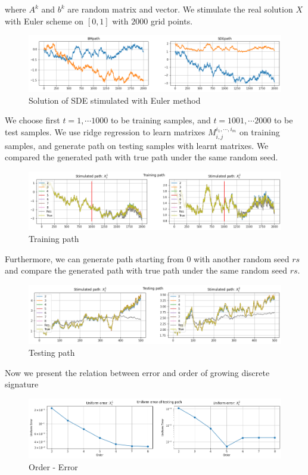 \documentclass[12pt]{report}
\theoremstyle{definition}
\theoremstyle{remark}
\begin{document}
where $A^{k}$ and $b^{k}$ are random matrix and vector. We stimulate the real solution $X$ with Euler scheme on $[0,1]$ with $2000$ grid points. 
\begin{figure}[H]
    \centering
    \includegraphics[width=\textwidth]{figs/res1.png}
    \caption{Solution of SDE stimulated with Euler method}
\end{figure}
We choose first $t=1,\cdots 1000$ to be training samples, and $t=1001,\cdots 2000$ to be test samples. We use ridge regression to learn matrixes $M^{i_{1},\cdots,i_{m}}_{i,j}$ on training samples, and generate path on testing samples with learnt matrixes. We compared the generated path with true path under the same random seed. 
\begin{figure}[H]
    \centering
    \includegraphics[width=\textwidth]{figs/res2.png}
    \caption{Training path}
\end{figure}
Furthermore, we can generate path starting from $0$ with another random seed $rs$ and compare the generated path with true path under the same random seed $rs$. 
\begin{figure}[H]
    \centering
    \includegraphics[width=\textwidth]{figs/res3.png}
    \caption{Testing path}
\end{figure}
Now we present the relation between error and order of growing discrete signature 
 \begin{figure}[H]
    \centering
    \includegraphics[width=\textwidth]{figs/res4.png}
    \caption{ Order - Error}
\end{figure}
\end{document}
